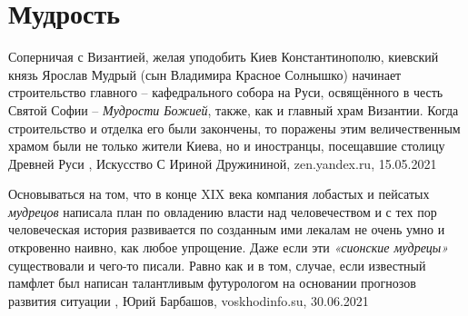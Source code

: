  
 
 
 
 
\chapter{Мудрость}
\label{sec:slova.mudrost}

Соперничая с Византией, желая уподобить Киев Константинополю, киевский князь
Ярослав Мудрый (сын Владимира Красное Солнышко) начинает строительство главного
– кафедрального собора на Руси, освящённого в честь Святой Софии – \emph{Мудрости
Божией}, также, как и главный храм Византии.  Когда строительство и отделка его
были закончены, то поражены этим величественным храмом были не только жители
Киева, но и иностранцы, посещавшие столицу Древней Руси
, 
Искусство С Ириной Дружининой, zen.yandex.ru, 15.05.2021

Основываться на том, что в конце XIX века компания лобастых и пейсатых \emph{мудрецов}
написала план по овладению власти над человечеством и с тех пор человеческая
история развивается по созданным ими лекалам не очень умно и откровенно наивно,
как любое упрощение. Даже если эти \emph{«сионские мудрецы»} существовали и чего-то
писали. Равно как и в том, случае, если известный памфлет был написан
талантливым футурологом на основании прогнозов развития ситуации
, 
Юрий Барбашов, voskhodinfo.su, 30.06.2021
